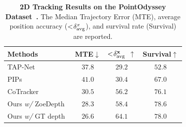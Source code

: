 \begin{table}[t!]
\centering\small
\setlength{\tabcolsep}{8pt}
\begin{tabular}{lccc}
\toprule
  \textbf{Methods} & \textbf{MTE}$\downarrow$ & $\mathbf{<\hspace{-0.2em}\delta_{\text{avg}}^{x}}$ $\uparrow$ & \textbf{Survival}$\uparrow$ \\
\midrule
TAP-Net~\cite{tap-vid} & $37.8$ & $29.2$  & $52.8$
\\ 
PIPs~\cite{zheng2023pointodyssey} & $41.0$ & $30.4$ & $67.0$ \\
CoTracker~\cite{cotracker}  & $30.5$  & $56.2$ & $76.1$  \\ 
Ours \textit{w/} ZoeDepth~\cite{ZoeDepth} & $28.3$ & $58.4$ & $\mathbf{78.6}$ \\
Ours \textit{w/} GT depth  & $\mathbf{26.6}$ & $\mathbf{64.1}$ & $78.0$\\
\bottomrule
\end{tabular}
\vspace{-5pt}
\caption{\textbf{2D Tracking Results on the PointOdyssey Dataset~\cite{zheng2023pointodyssey}.} The Median Trajectory Error (MTE), average position accuracy ($<\hspace{-0.2em}\delta_{\text{avg}}^{x}$), and survival rate (Survival) are reported.}
\label{table:PointOdyssey_2d}
\end{table}
    
